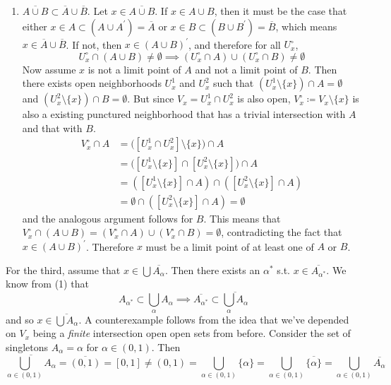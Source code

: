 \begin{solution}
\begin{enumerate}
      \item $\overline{A \cup B} \subset \overline{A} \cup \overline{B}$. Let $x \in \overline{A \cup B}$. If $x \in A \cup B$, then it must be the case that either $x \in A \subset (A \cup A^\prime) = \overline{A}$ or $x \in B \subset (B \cup B^\prime) = \overline{B}$, which means $x \in \overline{A} \cup \overline{B}$. If not, then $x \in (A \cup B)^\prime$, and therefore for all $U_x^\circ$, 
      \begin{equation}
        U_x^\circ \cap (A \cup B) \neq \emptyset \implies (U_x^\circ \cap A) \cup (U_x^\circ \cap B) \neq \emptyset
      \end{equation}
      Now assume $x$ is not a limit point of $A$ and not a limit point of $B$. Then there exists open neighborhoods $U^1_x$ and $U^2_x$ such that $(U_x^1 \setminus \{x\}) \cap A = \emptyset$ and $(U_x^2 \setminus \{x\}) \cap B = \emptyset$. But since $V_x = U_x^1 \cap U_x^2$ is also open, $V_x^\circ \coloneqq V_x \setminus \{x\}$ is also a existing punctured neighborhood that has a trivial intersection with $A$ and that with $B$. 
      \begin{align}
        V_x^\circ \cap A & = \big( [U_x^1 \cap U_x^2] \setminus \{x\} \big) \cap A \\
                         & = \big( [U_x^1 \setminus \{x\}] \cap [U_x^2 \setminus \{x\}] \big) \cap A \\
                         & = ([U_x^1 \setminus \{x\}] \cap A) \cap ([U_x^2 \setminus \{x\}] \cap A) \\ 
                         & = \emptyset \cap ([U_x^2 \setminus \{x\}] \cap A) = \emptyset
      \end{align}
      and the analogous argument follows for $B$. This means that $V_x^\circ \cap (A \cup B) = (V_x^\circ \cap A) \cup (V_x^\circ \cap B) = \emptyset$, contradicting the fact that $x \in (A \cup B)^\prime$. Therefore $x$ must be a limit point of at least one of $A$ or $B$. 
    \end{enumerate}

    For the third, assume that $x \in \bigcup \overline{A_\alpha}$. Then there exists an $\alpha^\ast$ s.t. $x \in \overline{A_{\alpha^\ast}}$. We know from (1) that 
    \begin{equation}
      A_{\alpha^\ast} \subset \bigcup_{\alpha} A_\alpha \implies \overline{A_{\alpha^\ast}} \subset \overline{\bigcup_{\alpha} A_\alpha} 
    \end{equation}
    and so $x \in \overline{\bigcup A_\alpha}$. A counterexample follows from the idea that we've depended on $V_x$ being a \textit{finite} intersection open open sets from before. Consider the set of singletons $A_\alpha = \alpha$ for $\alpha \in (0, 1)$. Then
    \begin{equation}
      \overline{\bigcup_{\alpha \in (0, 1)} A_\alpha} = \overline{(0, 1)} = [0, 1] \neq (0, 1) = \bigcup_{\alpha \in (0, 1)} \{\alpha\} = \bigcup_{\alpha \in (0, 1)} \overline{\{\alpha\}} =  \bigcup_{\alpha \in (0, 1)} \overline{A_\alpha} 
    \end{equation}
  \end{solution}

